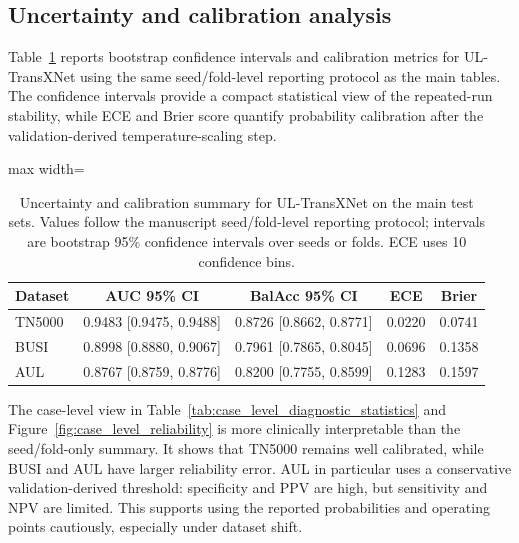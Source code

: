 \subsection{Uncertainty and calibration analysis}
Table~\ref{tab:calibration_uncertainty} reports bootstrap confidence intervals and calibration metrics for UL-TransXNet using the same seed/fold-level reporting protocol as the main tables. The confidence intervals provide a compact statistical view of the repeated-run stability, while ECE and Brier score quantify probability calibration after the validation-derived temperature-scaling step.

\begin{table}[t]
    \centering
    \small
    \caption{Uncertainty and calibration summary for UL-TransXNet on the main test sets. Values follow the manuscript seed/fold-level reporting protocol; intervals are bootstrap 95\% confidence intervals over seeds or folds. ECE uses 10 confidence bins.}
    \label{tab:calibration_uncertainty}
    \begin{adjustbox}{max width=\columnwidth}
    \begin{tabular}{lcccc}
        \toprule
        Dataset & AUC 95\% CI & BalAcc 95\% CI & ECE & Brier \\
        \midrule
        TN5000 & 0.9483 [0.9475, 0.9488] & 0.8726 [0.8662, 0.8771] & 0.0220 & 0.0741 \\
        BUSI & 0.8998 [0.8880, 0.9067] & 0.7961 [0.7865, 0.8045] & 0.0696 & 0.1358 \\
        AUL & 0.8767 [0.8759, 0.8776] & 0.8200 [0.7755, 0.8599] & 0.1283 & 0.1597 \\
        \bottomrule
    \end{tabular}
    \end{adjustbox}
\end{table}

The case-level view in Table~\ref{tab:case_level_diagnostic_statistics} and Figure~\ref{fig:case_level_reliability} is more clinically interpretable than the seed/fold-only summary. It shows that TN5000 remains well calibrated, while BUSI and AUL have larger reliability error. AUL in particular uses a conservative validation-derived threshold: specificity and PPV are high, but sensitivity and NPV are limited. This supports using the reported probabilities and operating points cautiously, especially under dataset shift.

